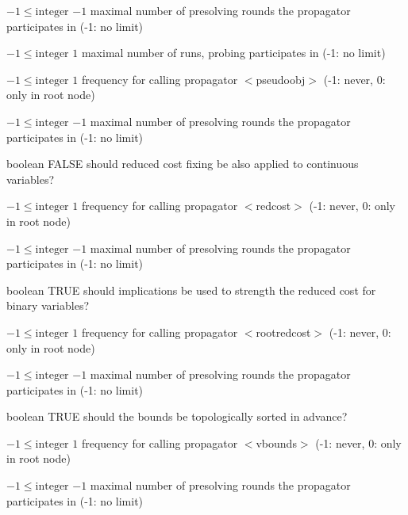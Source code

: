 %
{$-1\leq\textrm{integer}$}%
{$-1$}%
{maximal number of presolving rounds the propagator participates in (-1: no limit)}%
{}

%
{$-1\leq\textrm{integer}$}%
{$1$}%
{maximal number of runs, probing participates in (-1: no limit)}%
{}

%
{$-1\leq\textrm{integer}$}%
{$1$}%
{frequency for calling propagator $<$pseudoobj$>$ (-1: never, 0: only in root node)}%
{}

%
{$-1\leq\textrm{integer}$}%
{$-1$}%
{maximal number of presolving rounds the propagator participates in (-1: no limit)}%
{}

%
{boolean}%
{FALSE}%
{should reduced cost fixing be also applied to continuous variables?}%
{}

%
{$-1\leq\textrm{integer}$}%
{$1$}%
{frequency for calling propagator $<$redcost$>$ (-1: never, 0: only in root node)}%
{}

%
{$-1\leq\textrm{integer}$}%
{$-1$}%
{maximal number of presolving rounds the propagator participates in (-1: no limit)}%
{}

%
{boolean}%
{TRUE}%
{should implications be used to strength the reduced cost for binary variables?}%
{}

%
{$-1\leq\textrm{integer}$}%
{$1$}%
{frequency for calling propagator $<$rootredcost$>$ (-1: never, 0: only in root node)}%
{}

%
{$-1\leq\textrm{integer}$}%
{$-1$}%
{maximal number of presolving rounds the propagator participates in (-1: no limit)}%
{}

%
{boolean}%
{TRUE}%
{should the bounds be topologically sorted in advance?}%
{}

%
{$-1\leq\textrm{integer}$}%
{$1$}%
{frequency for calling propagator $<$vbounds$>$ (-1: never, 0: only in root node)}%
{}

%
{$-1\leq\textrm{integer}$}%
{$-1$}%
{maximal number of presolving rounds the propagator participates in (-1: no limit)}%
{}

